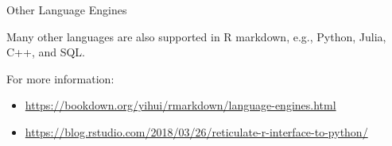 \begin{frame}{Other Language Engines}

Many other languages are also supported in R markdown, e.g., Python, Julia, C++, and SQL.
\vspace{5mm}

For more information:
\begin{itemize}
    \item \url{https://bookdown.org/yihui/rmarkdown/language-engines.html}
    \item \url{https://blog.rstudio.com/2018/03/26/reticulate-r-interface-to-python/}
\end{itemize}

    
\end{frame}